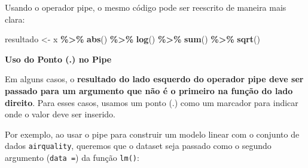 \documentclass[
]{book}
\newenvironment{Shaded}{\begin{snugshade}}{\end{snugshade}}
\newcommand{\FunctionTok}[1]{\textcolor[rgb]{0.13,0.29,0.53}{\textbf{#1}}}
\newcommand{\NormalTok}[1]{#1}
\newcommand{\OtherTok}[1]{\textcolor[rgb]{0.56,0.35,0.01}{#1}}
\newcommand{\SpecialCharTok}[1]{\textcolor[rgb]{0.81,0.36,0.00}{\textbf{#1}}}
\begin{document}
Usando o operador pipe, o mesmo código pode ser reescrito de maneira
mais clara:

\begin{Shaded}
\begin{Highlighting}[]
\NormalTok{resultado }\OtherTok{\textless{}{-}}\NormalTok{ x }\SpecialCharTok{\%\textgreater{}\%} 
  \FunctionTok{abs}\NormalTok{() }\SpecialCharTok{\%\textgreater{}\%} 
  \FunctionTok{log}\NormalTok{() }\SpecialCharTok{\%\textgreater{}\%} 
  \FunctionTok{sum}\NormalTok{() }\SpecialCharTok{\%\textgreater{}\%} 
  \FunctionTok{sqrt}\NormalTok{()}
\end{Highlighting}
\end{Shaded}

\textbf{Uso do Ponto (.) no Pipe}

Em alguns casos, o \textbf{resultado do lado esquerdo do operador pipe deve ser passado para um argumento que não é o primeiro na função do lado direito}. Para esses casos, usamos um ponto (.) como um marcador para indicar onde o valor deve ser inserido.

Por exemplo, ao usar o pipe para construir um modelo linear com o
conjunto de dados \texttt{airquality}, queremos que o dataset seja passado como
o segundo argumento (\texttt{data\ =}) da função \texttt{lm()}:
\end{document}
